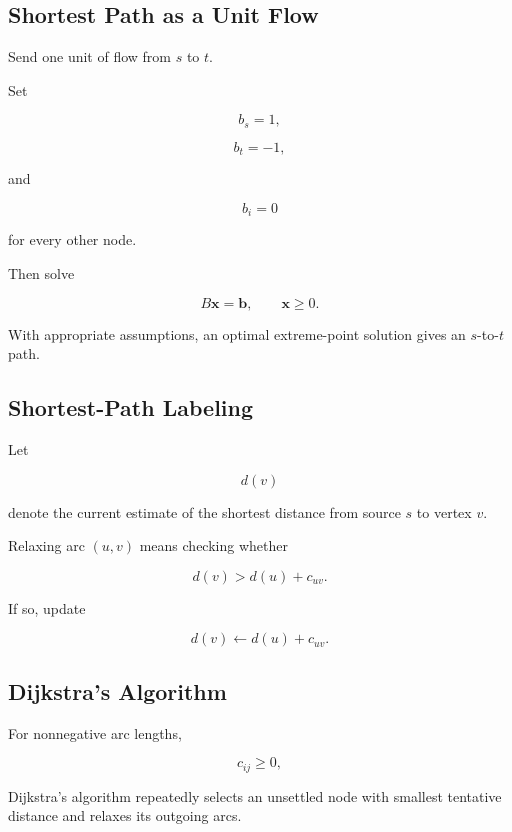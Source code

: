\subsection{Shortest Path as a Unit Flow}
\label{subsec:shortest-path-unit-flow}

Send one unit of flow from \(s\) to \(t\).

Set

\[
\boxed{
b_s=1,
}
\]

\[
\boxed{
b_t=-1,
}
\]

and

\[
\boxed{
b_i=0
}
\]

for every other node.

Then solve

\[
\boxed{
B\mathbf{x}
=
\mathbf{b},
\qquad
\mathbf{x}\geq0.
}
\]

With appropriate assumptions, an optimal extreme-point solution gives an
\(s\)-to-\(t\) path.

\subsection{Shortest-Path Labeling}
\label{subsec:shortest-path-labeling}

Let

\[
d(v)
\]

denote the current estimate of the shortest distance from source \(s\) to
vertex \(v\).

Relaxing arc \((u,v)\) means checking whether

\[
\boxed{
d(v)
>
d(u)+c_{uv}.
}
\]

If so, update

\[
\boxed{
d(v)
\leftarrow
d(u)+c_{uv}.
}
\]

\subsection{Dijkstra's Algorithm}
\label{subsec:dijkstra-network}

For nonnegative arc lengths,

\[
\boxed{
c_{ij}\geq0,
}
\]

Dijkstra's algorithm repeatedly selects an unsettled node with smallest
tentative distance and relaxes its outgoing arcs.


